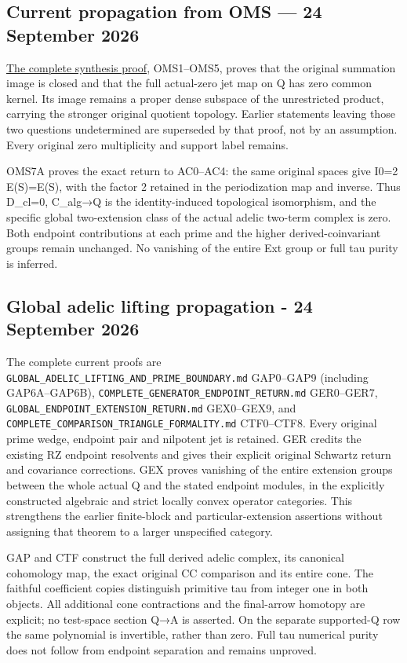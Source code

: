 \subsection{Current propagation from OMS --- 24 September
2026}\label{current-propagation-from-oms-24-september-2026-occurrence-2}

\href{ORIGINAL_MELLIN_SPECTRAL_SYNTHESIS.md}{The complete synthesis
proof}, OMS1--OMS5, proves that the original summation image is closed
and that the full actual-zero jet map on Q has zero common kernel. Its
image remains a proper dense subspace of the unrestricted product,
carrying the stronger original quotient topology. Earlier statements
leaving those two questions undetermined are superseded by that proof,
not by an assumption. Every original zero multiplicity and support label
remains.

OMS7A proves the exact return to AC0--AC4: the same original spaces give
I0=2 E(S)=E(S), with the factor 2 retained in the periodization map and
inverse. Thus D\_cl=0, C\_alg→Q is the identity-induced topological
isomorphism, and the specific global two-extension class of the actual
adelic two-term complex is zero. Both endpoint contributions at each
prime and the higher derived-coinvariant groups remain unchanged. No
vanishing of the entire Ext group or full tau purity is inferred.

\subsection{Global adelic lifting propagation - 24 September
2026}\label{global-adelic-lifting-propagation---24-september-2026-occurrence-2}

The complete current proofs are
\nolinkurl{GLOBAL_ADELIC_LIFTING_AND_PRIME_BOUNDARY.md} GAP0--GAP9 (including
GAP6A--GAP6B), \nolinkurl{COMPLETE_GENERATOR_ENDPOINT_RETURN.md} GER0--GER7,
\nolinkurl{GLOBAL_ENDPOINT_EXTENSION_RETURN.md} GEX0--GEX9, and
\nolinkurl{COMPLETE_COMPARISON_TRIANGLE_FORMALITY.md} CTF0--CTF8. Every original
prime wedge, endpoint pair and nilpotent jet is retained. GER credits
the existing RZ endpoint resolvents and gives their explicit original
Schwartz return and covariance corrections. GEX proves vanishing of the
entire extension groups between the whole actual Q and the stated
endpoint modules, in the explicitly constructed algebraic and strict
locally convex operator categories. This strengthens the earlier
finite-block and particular-extension assertions without assigning that
theorem to a larger unspecified category.

GAP and CTF construct the full derived adelic complex, its canonical
cohomology map, the exact original CC comparison and its entire cone.
The faithful coefficient copies distinguish primitive tau from integer
one in both objects. All additional cone contractions and the
final-arrow homotopy are explicit; no test-space section Q→A is
asserted. On the separate supported-Q row the same polynomial is
invertible, rather than zero. Full tau numerical purity does not follow
from endpoint separation and remains unproved.
